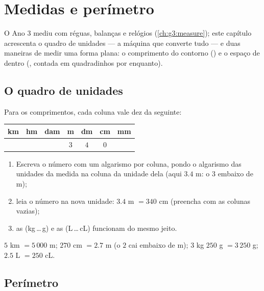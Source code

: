 \chapter{Medidas e perímetro}\label{ch:g4:measure}

O Ano 3 mediu com réguas, balanças e relógios
(\cref{ch:g3:measure}); este capítulo acrescenta o quadro de unidades
--- a máquina que converte tudo --- e duas maneiras de medir uma
forma plana: o comprimento do contorno () e o espaço de
dentro (, contada em quadradinhos por enquanto).

\section{O quadro de unidades}

\begin{method}\label{met:g4:measure:table}
Para os comprimentos, cada coluna vale dez da seguinte:
\begin{center}
\renewcommand{\arraystretch}{1.3}
\begin{tabular}{c|c|c|c|c|c|c}
km & hm & dam & m & dm & cm & mm \\
\hline
 & & & $3$ & $4$ & $0$ & \\
\end{tabular}
\end{center}
\begin{enumerate}
  \item Escreva o número com um algarismo por coluna, pondo o
        algarismo das unidades da medida na coluna da unidade dela
        (aqui $3.4$ m: o $3$ embaixo de m);
  \item leia o número na nova unidade: $3.4$ m $= 340$ cm (preencha
        com  as colunas vazias);
  \item as  (kg\,\dots\,g) e as  (L\,\dots\,cL)
        funcionam do mesmo jeito.
\end{enumerate}
\end{method}

\begin{example}\label{ex:g4:measure:convert}
$5$ km $= 5\,000$ m; \quad $270$ cm $= 2.7$ m (o $2$ cai embaixo de
m); \quad $3$ kg $250$ g $= 3\,250$ g; \quad
$2.5$ L $= 250$ cL.
\end{example}

\section{Perímetro}

